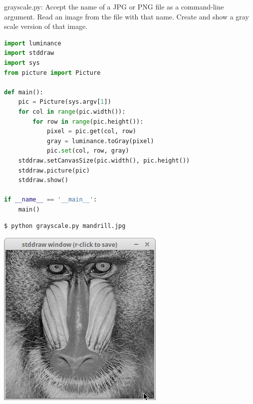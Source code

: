 \documentclass[8pt,a4paper,compress,handout]{beamer}
\begin{document}
\begin{frame}[fragile]
\begin{framed}
\tiny grayscale.py: Accept the name of a JPG or PNG file as a command-line argument. Read an image from the file with that name. Create and show a gray scale version of that image.
\end{framed}

\begin{lstlisting}[language=Python]
import luminance
import stddraw
import sys
from picture import Picture

def main():
    pic = Picture(sys.argv[1])
    for col in range(pic.width()):
        for row in range(pic.height()):
            pixel = pic.get(col, row)
            gray = luminance.toGray(pixel)
            pic.set(col, row, gray)
    stddraw.setCanvasSize(pic.width(), pic.height())
    stddraw.picture(pic)
    stddraw.show()

if __name__ == '__main__':
    main()
\end{lstlisting}

\begin{minipage}{150pt}
\begin{lstlisting}[language={}]
$ python grayscale.py mandrill.jpg
\end{lstlisting}
\end{minipage}%
\begin{minipage}{150pt}
\hfill \includegraphics[scale=0.2]{figures/grayscale.png}
\end{minipage}%
\end{frame}
\end{document}
